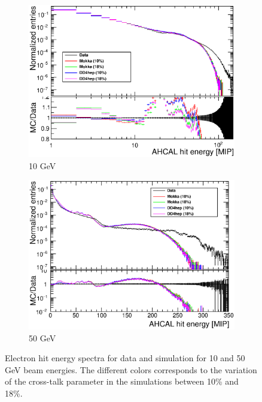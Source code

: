 \begin{figure}[htbp!]
	\centering
	\begin{subfigure}[t]{0.49\textwidth}
		\includegraphics[width=1.\linewidth]{../Thesis_Plots/EnergyCalib/Plots/HitEnergy_Electrons10GeV.eps}
		\caption{10 GeV} \label{fig:HitEnergy10GeVe}
	\end{subfigure}
	\hfill
	\begin{subfigure}[t]{0.49\textwidth}
		\includegraphics[width=1.\linewidth]{../Thesis_Plots/EnergyCalib/Plots/HitEnergy_Electrons50GeV.eps}
		\caption{50 GeV} \label{fig:HitEnergy50GeVe}
	\end{subfigure}
	\caption{Electron hit energy spectra for data and simulation for 10 and 50 GeV beam energies. The different colors corresponds to the variation of the cross-talk parameter in the simulations between 10\% and 18\%.}
	\label{fig:eHitVal}
\end{figure}

